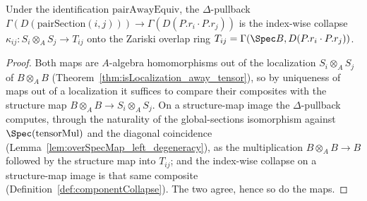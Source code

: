 \begin{lemma}
  \label{lem:pairAwayEquiv_appLE_diag}
  \leanok
  Under the identification \(\mathrm{pairAwayEquiv}\), the \(\Delta\)-pullback
  \(\Gamma(D(\mathrm{pairSection}(i, j))) \to \Gamma(D(P.r_i \cdot P.r_j))\) is the index-wise
  collapse \(\kappa_{ij} \colon S_i \otimes_A S_j \to T_{ij}\) onto the Zariski overlap ring
  \(T_{ij} = \Gamma(\Spec B, D(P.r_i \cdot P.r_j))\).
\end{lemma}
\begin{proof}
  \leanok
  Both maps are \(A\)-algebra homomorphisms out of the localization \(S_i \otimes_A S_j\) of
  \(B \otimes_A B\) (Theorem~\ref{thm:isLocalization_away_tensor}), so by uniqueness of maps out
  of a localization it suffices to compare their composites with the structure map
  \(B \otimes_A B \to S_i \otimes_A S_j\). On a structure-map image the \(\Delta\)-pullback
  computes, through the naturality of the global-sections isomorphism against
  \(\Spec(\mathrm{tensorMul})\) and the diagonal coincidence
  (Lemma~\ref{lem:overSpecMap_left_degeneracy}), as the multiplication \(B \otimes_A B \to B\)
  followed by the structure map into \(T_{ij}\); and the index-wise collapse on a structure-map
  image is that same composite (Definition~\ref{def:componentCollapse}). The two agree, hence so
  do the maps.
\end{proof}

